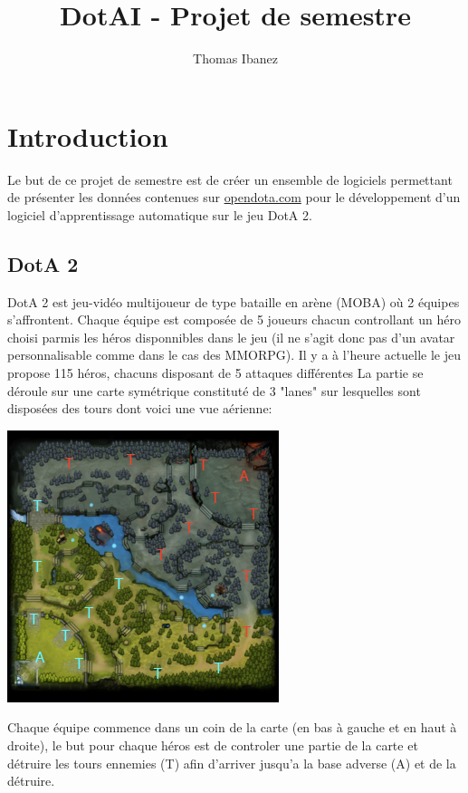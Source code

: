\documentclass{article}
\title{DotAI - Projet de semestre}
\author{Thomas Ibanez}
\begin{document}
\maketitle
\newpage
\section{Introduction}

Le but de ce projet de semestre est de créer un ensemble de logiciels permettant de présenter les données contenues sur \url{opendota.com} pour le développement d'un logiciel d'apprentissage automatique sur le jeu DotA 2.

\subsection{DotA 2}

DotA 2 est jeu-vidéo multijoueur de type bataille en arène (MOBA) où 2 équipes s'affrontent. Chaque équipe est composée de 5 joueurs chacun controllant un héro choisi parmis les héros disponnibles dans le jeu (il ne s'agit donc pas d'un avatar personnalisable comme dans le cas des MMORPG). Il y a à l'heure actuelle le jeu propose 115 héros, chacuns disposant de 5 attaques différentes La partie se déroule sur une carte symétrique constituté de 3 "lanes" sur lesquelles sont disposées des tours dont voici une vue aérienne: \\
\begin{center}
	\includegraphics[scale=1]{"minimap.png"} 
\end{center}

Chaque équipe commence dans un coin de la carte (en bas à gauche et en haut à droite), le but pour chaque héros est de controler une partie de la carte et détruire les tours ennemies (T) afin d'arriver jusqu'a la base adverse (A) et de la détruire.\\
\end{document}
